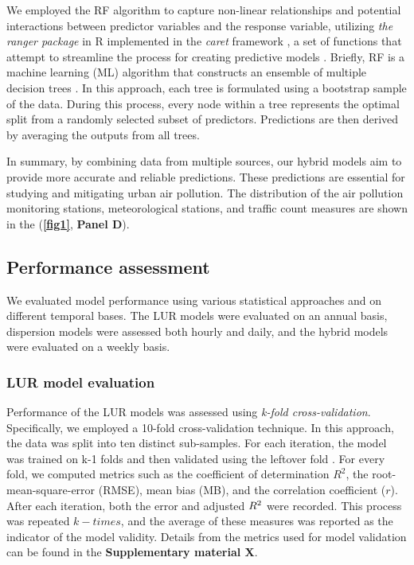 \documentclass{article}
\begin{document}
We employed the RF algorithm to capture non-linear relationships and potential interactions between predictor variables and the response variable, utilizing \textit{the ranger package} in R implemented in the \textit{caret} framework \cite{wright2019}, a set of functions that attempt to streamline the process for creating predictive models \cite{caret2008}. Briefly, RF is a machine learning (ML) algorithm that constructs an ensemble of multiple decision trees \cite{breiman2001}. In this approach, each tree is formulated using a bootstrap sample of the data. During this process, every node within a tree represents the optimal split from a randomly selected subset of predictors. Predictions are then derived by averaging the outputs from all trees.

In summary, by combining data from multiple sources, our hybrid models aim to provide more accurate and reliable predictions. These predictions are essential for studying and mitigating urban air pollution. The distribution of the air pollution monitoring stations, meteorological stations, and traffic count measures are shown in the (\textbf{\cref{fig1}}, \textbf{Panel D}). 

\subsection{Performance assessment}

We evaluated model performance using various statistical approaches and on different temporal bases. The LUR models were evaluated on an annual basis, dispersion models were assessed both hourly and daily, and the hybrid models were evaluated on a weekly basis.

\subsubsection{LUR model evaluation}
Performance of the LUR models was assessed using \textit{k-fold cross-validation}. Specifically, we employed a 10-fold cross-validation technique. In this approach, the data was split into ten distinct sub-samples. For each iteration, the model was trained on k-1 folds and then validated using the leftover fold \cite{ziegel2003}. For every fold, we computed metrics such as the coefficient of determination \(R^2\), the root-mean-square-error (RMSE), mean bias (MB), and the correlation coefficient (\(r\)). After each iteration, both the error and adjusted \(R\textsuperscript{2}\) were recorded. This process was repeated \(k-times\), and the average of these measures was reported as the indicator of the model validity. Details from the metrics used for model validation can be found in the \textbf{Supplementary material X}.\\
\end{document}
